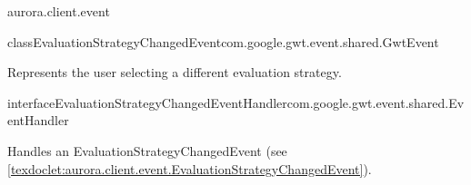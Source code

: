\begin{texdocpackage}{aurora.client.event}
\begin{texdocclass}{class}{EvaluationStrategyChangedEvent}{com.google.gwt.event.shared.GwtEvent}{}
\label{texdoclet:aurora.client.event.EvaluationStrategyChangedEvent}
\begin{texdocclassintro}
Represents the user selecting a different evaluation strategy.\end{texdocclassintro}
\begin{texdocclassfields}
\end{texdocclassfields}
\begin{texdocclassconstructors}
\end{texdocclassconstructors}
\begin{texdocclassmethods}
\end{texdocclassmethods}
\end{texdocclass}


\begin{texdocclass}{interface}{EvaluationStrategyChangedEventHandler}{}{com.google.gwt.event.shared.EventHandler}
\label{texdoclet:aurora.client.event.EvaluationStrategyChangedEventHandler}
\begin{texdocclassintro}
Handles an EvaluationStrategyChangedEvent (see \ref{texdoclet:aurora.client.event.EvaluationStrategyChangedEvent}).\end{texdocclassintro}
\begin{texdocclassmethods}
\end{texdocclassmethods}
\end{texdocclass}



\end{texdocpackage}
